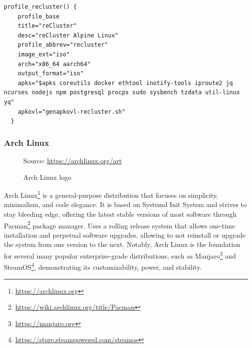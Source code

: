\begin{lstlisting}[language=shell, morekeywords={[2]{profile_recluster, profile_base}}, morekeywords={[4]{title, desc, profile_abbrev, image_ext, arch, output_format, apks, apkovl}}, xleftmargin=\parindent, label={lst:alpine}, caption=Contents of \texttt{mkimg.recluster.sh} file which shows the reCluster profile definition]
  profile_recluster() {
    profile_base
    title="reCluster"
    desc="reCluster Alpine Linux"
    profile_abbrev="recluster"
    image_ext="iso"
    arch="x86_64 aarch64"
    output_format="iso"
    apks="$apks coreutils docker ethtool inotify-tools iproute2 jq ncurses nodejs npm postgresql procps sudo sysbench tzdata util-linux yq"
    apkovl="genapkovl-recluster.sh"
  }
\end{lstlisting}

\subsubsection{Arch Linux}
\label{subsubsec:implementation_distributions_iso_arch_linux}

\begin{figure} %
  \centering
  \def\stackalignment{r} %
  {\scriptsize \parbox[t]{\linewidth}{ Source: \url{https://archlinux.org/art}} }
  \caption{Arch Linux logo}
\end{figure}

Arch Linux\footnote{\url{https://archlinux.org}} is a general-purpose
distribution that focuses on simplicity, minimalism, and code elegance. It is based
on Systemd Init System and strives to stay bleeding edge, offering the latest
stable versions of most software through Pacman\footnote{\url{https://wiki.archlinux.org/title/Pacman}}
package manager. Uses a rolling release system that allows one-time installation
and perpetual software upgrades, allowing to not reinstall or upgrade the system
from one version to the next. Notably, Arch Linux is the foundation for several
many popular enterprise-grade distributions, such as Manjaro\footnote{\url{https://manjaro.org}}
and SteamOS\footnote{\url{https://store.steampowered.com/steamos}},
demonstrating its customizability, power, and stability.

